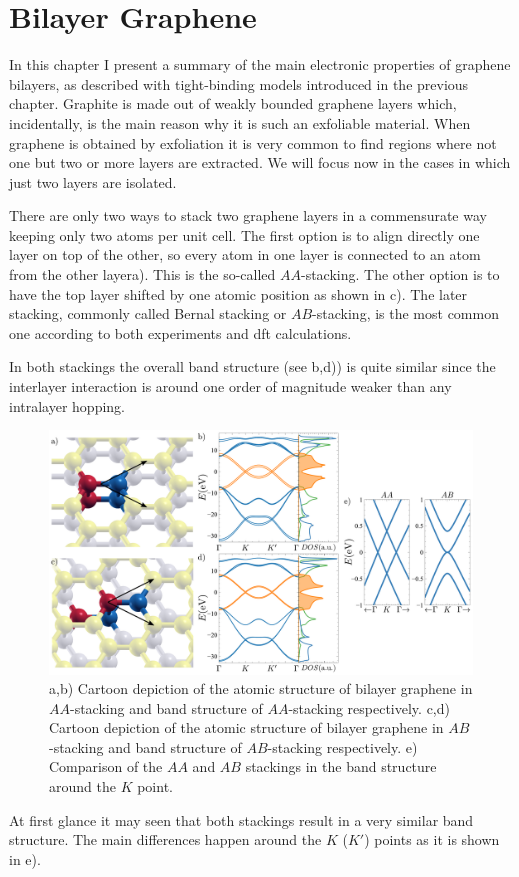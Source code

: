 \chapter{Bilayer Graphene}
\label{ch:bilayer}
In this chapter I present a summary of the main electronic properties of graphene bilayers, as described with tight-binding models introduced in the previous chapter.
Graphite is made out of weakly bounded graphene layers which, incidentally, is the main reason why it is such an exfoliable material. When graphene is obtained by exfoliation it is very common to find regions where not one but two or more layers are extracted. We will focus now in the cases in which just two layers are isolated.

There are only two ways to stack two graphene layers in a commensurate way keeping only two atoms per unit cell. The first option is to align directly one layer on top of the other, so every atom in one layer is connected to an atom from the other layera). This is the so-called $AA$-stacking.
The other option is to have the top layer shifted by one atomic position as shown in c). The later stacking, commonly called Bernal stacking or $AB$-stacking, is the most common one according to both experiments and \ac{dft} calculations\cite{Norimatsu2010,Charlier1994,Charlier1994a}.

In both stackings the overall band structure (see b,d)) is quite similar since the interlayer interaction is around one order of magnitude weaker than any intralayer hopping.
\begin{figure}[h!]
\centering
\includegraphics{graphene_bilayer/figures/bilayer_stackings.pdf}
\vspace{-10pt}
\caption{a,b) Cartoon depiction of the atomic structure of bilayer graphene in $AA$-stacking and band structure of $AA$-stacking respectively. c,d) Cartoon depiction of the atomic structure of bilayer graphene in $AB$-stacking and band structure of $AB$-stacking respectively. e) Comparison of the $AA$ and $AB$ stackings in the band structure around the $K$ point.}
\label{Gbi_stack}
\end{figure}
At first glance it may seen that both stackings result in a very similar band structure. The main differences happen around the $K$ ($K'$) points as it is shown in e).

